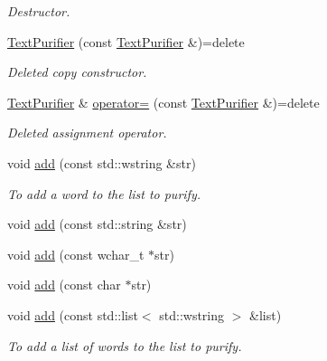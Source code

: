 \begin{DoxyCompactItemize}
\begin{DoxyCompactList}\small\item\em Destructor. \end{DoxyCompactList}\item 
\mbox{\label{classlakoo_1_1_text_purifier_add5390a74c2764b2970817ee919bf467}} 
\hyperlink{classlakoo_1_1_text_purifier_add5390a74c2764b2970817ee919bf467}{Text\+Purifier} (const \hyperlink{classlakoo_1_1_text_purifier}{Text\+Purifier} \&)=delete
\begin{DoxyCompactList}\small\item\em Deleted copy constructor. \end{DoxyCompactList}\item 
\mbox{\label{classlakoo_1_1_text_purifier_ae75b6ea7db94bea2c8326a929a436aae}} 
\hyperlink{classlakoo_1_1_text_purifier}{Text\+Purifier} \& \hyperlink{classlakoo_1_1_text_purifier_ae75b6ea7db94bea2c8326a929a436aae}{operator=} (const \hyperlink{classlakoo_1_1_text_purifier}{Text\+Purifier} \&)=delete
\begin{DoxyCompactList}\small\item\em Deleted assignment operator. \end{DoxyCompactList}\item 
void \hyperlink{classlakoo_1_1_text_purifier_ae2279e22ee6470d3e0a0deb1b58e35f2}{add} (const std\+::wstring \&str)
\begin{DoxyCompactList}\small\item\em To add a word to the list to purify. \end{DoxyCompactList}\item 
void \hyperlink{classlakoo_1_1_text_purifier_a7a898c7d01f97ed6a275d2b6cf631746}{add} (const std\+::string \&str)
\item 
void \hyperlink{classlakoo_1_1_text_purifier_ae8d3ed1b3f6b05bc5e0a103e60200f86}{add} (const wchar\+\_\+t $\ast$str)
\item 
void \hyperlink{classlakoo_1_1_text_purifier_ad035c47d9d3ab94a38aeb46602ae2cc4}{add} (const char $\ast$str)
\item 
void \hyperlink{classlakoo_1_1_text_purifier_a2f8d0c108599b5731424d5bfef6e4c00}{add} (const std\+::list$<$ std\+::wstring $>$ \&list)
\begin{DoxyCompactList}\small\item\em To add a list of words to the list to purify. \end{DoxyCompactList}\item 

\end{DoxyCompactItemize}
